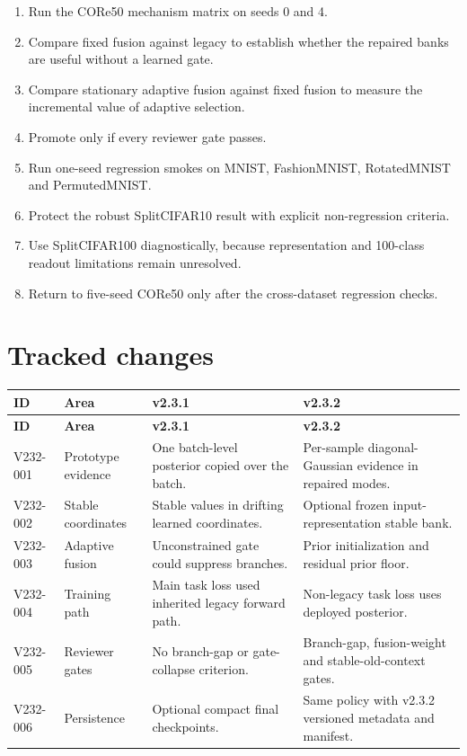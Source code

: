 \documentclass[11pt,a4paper]{article}
\begin{document}
\begin{enumerate}[leftmargin=1.5em]
\item Run the CORe50 mechanism matrix on seeds 0 and 4.
\item Compare fixed fusion against legacy to establish whether the repaired banks are useful without a learned gate.
\item Compare stationary adaptive fusion against fixed fusion to measure the incremental value of adaptive selection.
\item Promote only if every reviewer gate passes.
\item Run one-seed regression smokes on MNIST, FashionMNIST, RotatedMNIST and PermutedMNIST.
\item Protect the robust SplitCIFAR10 result with explicit non-regression criteria.
\item Use SplitCIFAR100 diagnostically, because representation and 100-class readout limitations remain unresolved.
\item Return to five-seed CORe50 only after the cross-dataset regression checks.
\end{enumerate}

\section{Tracked changes}

\begin{longtable}{p{1.6cm}p{2.8cm}p{5.2cm}p{5.2cm}}
\toprule
\textbf{ID} & \textbf{Area} & \textbf{v2.3.1} & \textbf{v2.3.2} \\
\midrule
\endfirsthead
\toprule
\textbf{ID} & \textbf{Area} & \textbf{v2.3.1} & \textbf{v2.3.2} \\
\midrule
\endhead
V232-001 & Prototype evidence & One batch-level posterior copied over the batch. & Per-sample diagonal-Gaussian evidence in repaired modes. \\
V232-002 & Stable coordinates & Stable values in drifting learned coordinates. & Optional frozen input-representation stable bank. \\
V232-003 & Adaptive fusion & Unconstrained gate could suppress branches. & Prior initialization and residual prior floor. \\
V232-004 & Training path & Main task loss used inherited legacy forward path. & Non-legacy task loss uses deployed posterior. \\
V232-005 & Reviewer gates & No branch-gap or gate-collapse criterion. & Branch-gap, fusion-weight and stable-old-context gates. \\
V232-006 & Persistence & Optional compact final checkpoints. & Same policy with v2.3.2 versioned metadata and manifest. \\
\bottomrule
\end{longtable}
\end{document}
